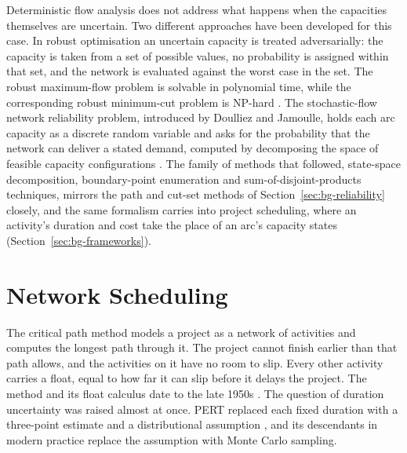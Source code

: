 \documentclass[12pt]{report}
\begin{document}
Deterministic flow analysis does not address what happens when the capacities themselves are
uncertain. Two different approaches have been developed for this case. In robust
optimisation an uncertain capacity is treated adversarially: the capacity is taken from a set
of possible values, no probability is assigned within that set, and the network is evaluated
against the worst case in the set. The robust maximum-flow problem is solvable in polynomial
time, while the corresponding robust minimum-cut problem is NP-hard \cite{bertsimas2013robust}.
The stochastic-flow network reliability problem, introduced by
Doulliez and Jamoulle, holds each arc capacity as a discrete random variable and asks for the
probability that the network can deliver a stated demand, computed by decomposing the space of
feasible capacity configurations \cite{doulliez1972transportation}. The family of methods that
followed, state-space decomposition, boundary-point enumeration and sum-of-disjoint-products
techniques, mirrors the path and cut-set methods of Section~\ref{sec:bg-reliability} closely,
and the same formalism carries into project scheduling, where an activity's duration and cost
take the place of an arc's capacity states (Section~\ref{sec:bg-frameworks}).

\section{Network Scheduling}
\label{sec:bg-schedule}

The critical path method models a project as a network of activities and computes the longest
path through it. The project cannot finish earlier than that path allows, and the activities on it have no
room to slip. Every other activity carries a float, equal to how far it can slip before it
delays the project. The method and its float calculus date to the late 1950s
\cite{kelley1959critical}. The question of duration uncertainty was raised almost at once. PERT
replaced each fixed duration with a three-point estimate and a distributional assumption
\cite{malcolm1959pert}, and its descendants in modern practice replace the assumption with
Monte Carlo sampling.
\end{document}

